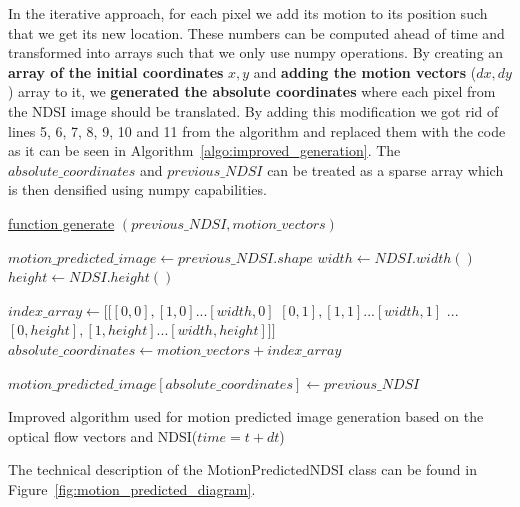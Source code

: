 \documentclass[12pt, a4paper]{report}
\begin{document}
	\par In the iterative approach, for each pixel we add its motion to its position such that we get its new location. These numbers can be computed ahead of time and transformed into arrays such that we only use numpy operations. By creating an \textbf{array of the initial coordinates} \(x, y\) and \textbf{adding the motion vectors} (\(dx, dy\)) array to it, we \textbf{generated the absolute coordinates} where each pixel from the NDSI image should be translated. By adding this modification we got rid of lines 5, 6, 7, 8, 9, 10 and 11 from the algorithm and replaced them with the code as it can be seen in Algorithm~\ref{algo:improved_generation}. The \(absolute\_coordinates\) and \(previous\_NDSI\) can be treated as a sparse array which is then densified using numpy capabilities.

	\begin{algorithm}
		
		\underline{function generate} $(previous\_NDSI, motion\_vectors)$\;
		
		$motion\_predicted\_image \gets previous\_NDSI.shape$\;
		$width \gets NDSI.width()$\;
		$height \gets NDSI.height()$\;
		
		$index\_array \gets [[[0, 0], [1, 0] ... [width, 0]$
		$[0, 1], [1, 1] ... [width, 1]$
		$...$
		$[0, height], [1, height] ... [width, height]]]$\;
		$absolute\_coordinates \gets motion\_vectors + index\_array$\;
		
		$motion\_predicted\_image[absolute\_coordinates] \gets previous\_NDSI$\;
	
		\;
		
		\caption{Improved algorithm used for motion predicted image generation based on the optical flow vectors and NDSI(\(time=t+dt\))}
		\label{algo:improved_generation}
	\end{algorithm}

	\par The technical description of the MotionPredictedNDSI class can be found in Figure~\ref{fig:motion_predicted_diagram}.
	
\end{document}
